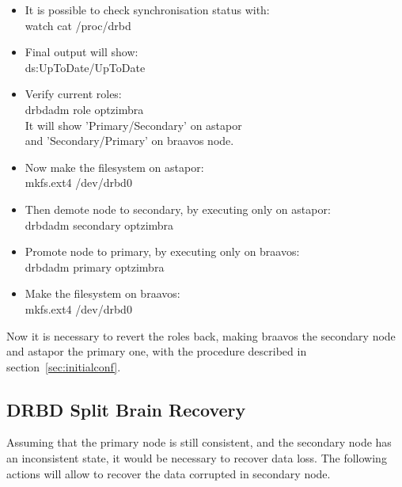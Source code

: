 \documentclass[a4paper, 12pt]{book}
\begin{document}
\begin{itemize}
	\item It is possible to check synchronisation status with:\\
		watch cat /proc/drbd

	\item Final output will show:\\
		ds:UpToDate/UpToDate

	\item Verify current roles:\\
		drbdadm role optzimbra\\
		It will show 'Primary/Secondary' on astapor \\
		and 'Secondary/Primary' on braavos node.

	\item Now make the filesystem on astapor:\\
		mkfs.ext4 /dev/drbd0

	\item Then demote node to secondary, by executing only on astapor:\\
		drbdadm secondary optzimbra

	\item Promote node to primary, by executing only on braavos:\\
		drbdadm primary optzimbra

	\item Make the filesystem on braavos:\\
		mkfs.ext4 /dev/drbd0

\end{itemize}

\noindent Now it is necessary to revert the roles back, making braavos the secondary node and astapor the primary one, with the procedure described in section~\ref{sec:initialconf}.



\subsection{DRBD Split Brain Recovery}
\label{sec:splitbrain}

\noindent Assuming that the primary node is still consistent, and the secondary node has an inconsistent state, it would be necessary to recover data loss. The following actions will allow to recover the data corrupted in secondary node.
\end{document}
